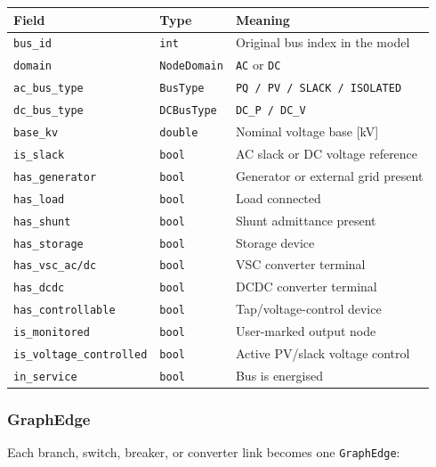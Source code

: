 \begin{center}
\begin{tabular}{lll}
\hline\hline
\textbf{Field} & \textbf{Type} & \textbf{Meaning} \\
\hline
\texttt{bus\_id}            & \texttt{int}       & Original bus index in the model \\
\texttt{domain}             & \texttt{NodeDomain}& \texttt{AC} or \texttt{DC} \\
\texttt{ac\_bus\_type}      & \texttt{BusType}   & \texttt{PQ / PV / SLACK / ISOLATED} \\
\texttt{dc\_bus\_type}      & \texttt{DCBusType} & \texttt{DC\_P / DC\_V} \\
\texttt{base\_kv}           & \texttt{double}    & Nominal voltage base [kV] \\
\texttt{is\_slack}          & \texttt{bool}      & AC slack or DC voltage reference \\
\texttt{has\_generator}     & \texttt{bool}      & Generator or external grid present \\
\texttt{has\_load}          & \texttt{bool}      & Load connected \\
\texttt{has\_shunt}         & \texttt{bool}      & Shunt admittance present \\
\texttt{has\_storage}       & \texttt{bool}      & Storage device \\
\texttt{has\_vsc\_ac/dc}    & \texttt{bool}      & VSC converter terminal \\
\texttt{has\_dcdc}          & \texttt{bool}      & DCDC converter terminal \\
\texttt{has\_controllable}  & \texttt{bool}      & Tap/voltage-control device \\
\texttt{is\_monitored}      & \texttt{bool}      & User-marked output node \\
\texttt{is\_voltage\_controlled} & \texttt{bool} & Active PV/slack voltage control \\
\texttt{in\_service}        & \texttt{bool}      & Bus is energised \\
\hline\hline
\end{tabular}
\end{center}

\subsubsection{GraphEdge}

Each branch, switch, breaker, or converter link becomes one
\texttt{GraphEdge}:

